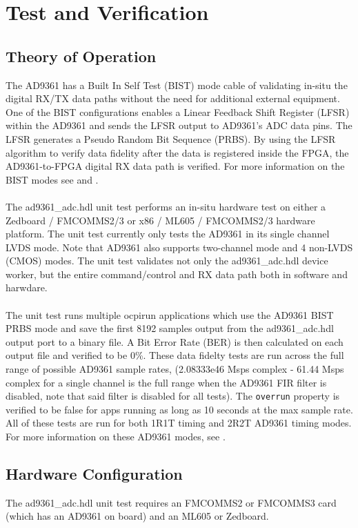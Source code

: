\documentclass{article}
\def\comp{ad9361\_adc}
\begin{document}
\section*{Test and Verification}
\subsection*{Theory of Operation}
The AD9361 has a Built In Self Test (BIST) mode cable of validating in-situ the digital RX/TX data paths without the need for additional external equipment. One of the BIST configurations enables a Linear Feedback Shift Register (LFSR) within the AD9361 and sends the LFSR output to AD9361's ADC data pins. The LFSR generates a Pseudo Random Bit Sequence (PRBS). By using the LFSR algorithm to verify data fidelity after the data is registered inside the FPGA, the AD9361-to-FPGA digital RX data path is verified. For more information on the BIST modes see \cite{adi_bist_doc} and \cite{adi_ug570}. \\ \\
The \comp{}.hdl unit test performs an in-situ hardware test on either a Zedboard / FMCOMMS2/3 or x86 / ML605 / FMCOMMS2/3 hardware platform. The unit test currently only tests the AD9361 in its single channel LVDS mode. Note that AD9361 also supports two-channel mode and 4 non-LVDS (CMOS) modes. The unit test validates not only the \comp{}.hdl device worker, but the entire command/control and RX data path both in software and harwdare. \\ \\
The unit test runs multiple ocpirun applications which use the AD9361 BIST PRBS mode and save the first 8192 samples output from the \comp{}.hdl output port to a binary file. A Bit Error Rate (BER) is then calculated on each output file and verified to be 0\%. These data fidelty tests are run across the full range of possible AD9361 sample rates, (2.08333e46 Msps complex - 61.44 Msps complex for a single channel is the full range when the AD9361 FIR filter is disabled, note that said filter is disabled for all tests). The \verb+overrun+ property is verified to be false for apps running as long as 10 seconds at the max sample rate. All of these tests are run for both 1R1T timing and 2R2T AD9361 timing modes. For more information on these AD9361 modes, see \cite{adi_ug570}.
\subsection*{Hardware Configuration}
The \comp{}.hdl unit test requires an FMCOMMS2 or FMCOMMS3 card (which has an AD9361 on board) and an ML605 or Zedboard.
\end{document}

